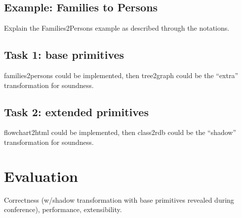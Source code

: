\documentclass[a4paper]{scrartcl}
\begin{document}
\subsection{Example: Families to Persons}
\label{sec:f2p}

Explain the Families2Persons example as described through the
notations.

\subsection{Task 1: base primitives}
\label{sec:baseprim}


families2persons could be implemented, then tree2graph could be the
``extra'' transformation for soundness.

\subsection{Task 2: extended primitives}
\label{sec:extprim}


flowchart2html could be implemented, then class2rdb could be the
``shadow'' transformation for soundness.

\section{Evaluation}
\label{sec:eval}

Correctness (w/shadow transformation with base primitives revealed
during conference), performance, extensibility.



\end{document}
